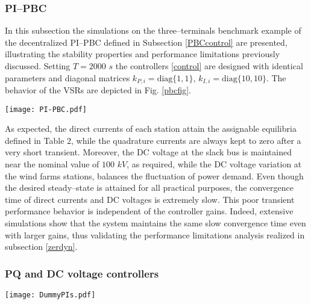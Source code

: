 \documentclass[5p,twocolumn]{elsarticle}
\numberwithin{equation}{section}
\begin{document}
\subsubsection{PI--PBC}
\label{simpipbc}
In this subsection the simulations on the three--terminals benchmark example of the decentralized PI--PBC defined in Subsection \ref{PBCcontrol} are presented, illustrating the stability properties and performance limitations previously discussed. Setting $T=2000$ $s$ the controllers \eqref{control} are designed with identical parameters and diagonal matrices $k_{P,i}=\mathrm{diag}\{1,1\}$, $k_{I,i}=\mathrm{diag}\{10,10\}$. The behavior of the VSRs are depicted in Fig. \ref{pbcfig}.
\begin{figure*}[ht]
 \centering
 \texttt{[image: PI-PBC.pdf]}
\caption{{Responses of VSRs variables under the decentralized PI--PBC.}}
 \label{pbcfig}
\end{figure*}

As expected, the direct currents of each station attain the assignable equilibria defined in Table 2, while the quadrature currents are always kept to zero after a very short transient. Moreover, the DC voltage at the slack bus is maintained near the nominal value of $100$ $kV$, as required, while the DC voltage variation at the wind farms stations, balances the fluctuation of power demand. Even though the desired steady--state is attained for all practical purposes, the convergence time of direct currents and DC voltages is extremely slow. This poor transient performance behavior is independent of the controller gains. Indeed, extensive simulations show that the system maintains the same slow convergence time even with larger gains, thus validating the performance limitations analysis realized in subsection \ref{zerdyn}.


\subsubsection{PQ and DC voltage controllers}


\begin{figure*}[ht]
 \centering
 \texttt{[image: DummyPIs.pdf]}
\caption{{Responses of VSRs variables under the decentralized PQ and DC voltage controllers.}}
 \label{PIfig}
\end{figure*}
\end{document}
